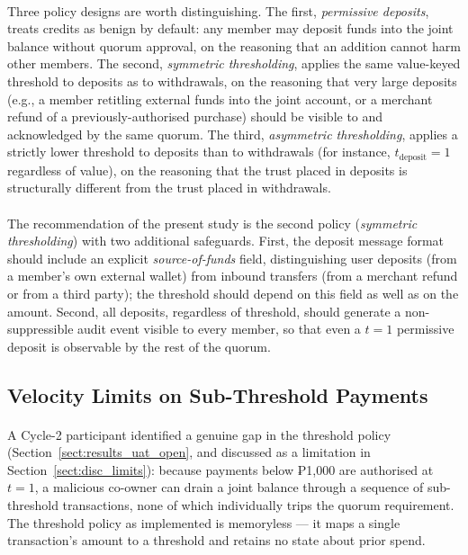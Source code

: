 \paragraph{}Three policy designs are worth distinguishing. The first, \textit{permissive deposits}, treats credits as benign by default: any member may deposit funds into the joint balance without quorum approval, on the reasoning that an addition cannot harm other members. The second, \textit{symmetric thresholding}, applies the same value-keyed threshold to deposits as to withdrawals, on the reasoning that very large deposits (e.g., a member retitling external funds into the joint account, or a merchant refund of a previously-authorised purchase) should be visible to and acknowledged by the same quorum. The third, \textit{asymmetric thresholding}, applies a strictly lower threshold to deposits than to withdrawals (for instance, $t_{\text{deposit}} = 1$ regardless of value), on the reasoning that the trust placed in deposits is structurally different from the trust placed in withdrawals.

\paragraph{}The recommendation of the present study is the second policy (\textit{symmetric thresholding}) with two additional safeguards. First, the deposit message format should include an explicit \textit{source-of-funds} field, distinguishing user deposits (from a member's own external wallet) from inbound transfers (from a merchant refund or from a third party); the threshold should depend on this field as well as on the amount. Second, all deposits, regardless of threshold, should generate a non-suppressible audit event visible to every member, so that even a $t = 1$ permissive deposit is observable by the rest of the quorum.

\subsection{Velocity Limits on Sub-Threshold Payments}
\label{sect:rec_velocity}

\paragraph{}A Cycle-2 participant identified a genuine gap in the threshold policy (Section~\ref{sect:results_uat_open}, and discussed as a limitation in Section~\ref{sect:disc_limits}): because payments below ₱1{,}000 are authorised at $t = 1$, a malicious co-owner can drain a joint balance through a sequence of sub-threshold transactions, none of which individually trips the quorum requirement. The threshold policy as implemented is memoryless --- it maps a single transaction's amount to a threshold and retains no state about prior spend.


